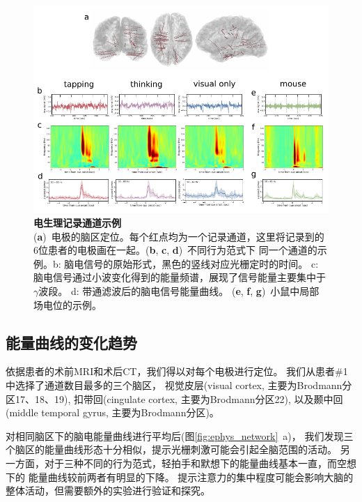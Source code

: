 \begin{figure}[h]
    \centering
    \includegraphics[width=\textwidth]{src/figures/ephys_examples.pdf}
    \caption{\textbf{电生理记录通道示例}\\
    (\textbf{a})~电极的脑区定位。每个红点均为一个记录通道，这里将记录到的
    6位患者的电极画在一起。(\textbf{b}, \textbf{c}, \textbf{d})~不同行为范式下
    同一个通道的示例。b: 脑电信号的原始形式，黑色的竖线对应光栅定时的时间。
    c: 脑电信号通过小波变化得到的能量频谱，展现了信号能量主要集中于\(\gamma\)波段。
    d: 带通滤波后的脑电信号能量曲线。
    (\textbf{e}, \textbf{f}, \textbf{g})~小鼠中局部场电位的示例。}
    \label{fig:ephys_example}
\end{figure}

\subsection{能量曲线的变化趋势}
依据患者的术前MRI和术后CT，我们得以对每个电极进行定位。
我们从患者\#1中选择了通道数目最多的三个脑区，
视觉皮层(visual cortex, 主要为Brodmann分区17、18、19),
扣带回(cingulate cortex, 主要为Brodmann分区22), %
以及颞中回(middle temporal gyrus, 主要为Brodmann分区)。%

对相同脑区下的脑电能量曲线进行平均后(图\ref{fig:ephys_network}~a)，
我们发现三个脑区的能量曲线形态十分相似，提示光栅刺激可能会引起全脑范围的活动。
另一方面，对于三种不同的行为范式，轻拍手和默想下的能量曲线基本一直，而空想下的
能量曲线较前两者有明显的下降。%
提示注意力的集中程度可能会影响大脑的整体活动，但需要额外的实验进行验证和探究。


